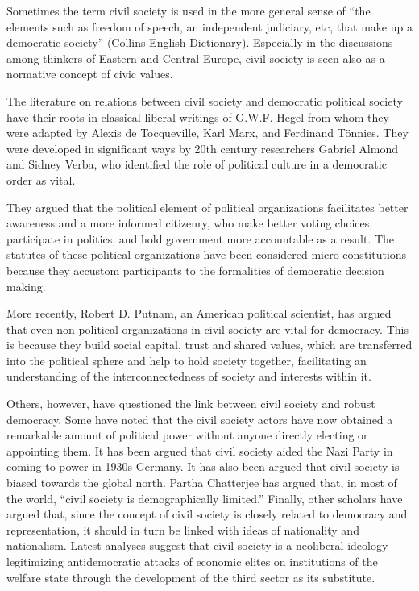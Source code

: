 \documentclass[
  openany]{book}
\begin{document}
Sometimes the term civil society is used in the more general sense of ``the elements such as freedom of speech, an independent judiciary, etc, that make up a democratic society'' (Collins English Dictionary). Especially in the discussions among thinkers of Eastern and Central Europe, civil society is seen also as a normative concept of civic values.

The literature on relations between civil society and democratic political society have their roots in classical liberal writings of G.W.F. Hegel from whom they were adapted by Alexis de Tocqueville, Karl Marx, and Ferdinand Tönnies. They were developed in significant ways by 20th century researchers Gabriel Almond and Sidney Verba, who identified the role of political culture in a democratic order as vital.

They argued that the political element of political organizations facilitates better awareness and a more informed citizenry, who make better voting choices, participate in politics, and hold government more accountable as a result. The statutes of these political organizations have been considered micro-constitutions because they accustom participants to the formalities of democratic decision making.

More recently, Robert D. Putnam, an American political scientist, has argued that even non-political organizations in civil society are vital for democracy. This is because they build social capital, trust and shared values, which are transferred into the political sphere and help to hold society together, facilitating an understanding of the interconnectedness of society and interests within it.

Others, however, have questioned the link between civil society and robust democracy. Some have noted that the civil society actors have now obtained a remarkable amount of political power without anyone directly electing or appointing them. It has been argued that civil society aided the Nazi Party in coming to power in 1930s Germany. It has also been argued that civil society is biased towards the global north. Partha Chatterjee has argued that, in most of the world, ``civil society is demographically limited.'' Finally, other scholars have argued that, since the concept of civil society is closely related to democracy and representation, it should in turn be linked with ideas of nationality and nationalism. Latest analyses suggest that civil society is a neoliberal ideology legitimizing antidemocratic attacks of economic elites on institutions of the welfare state through the development of the third sector as its substitute.
\end{document}
